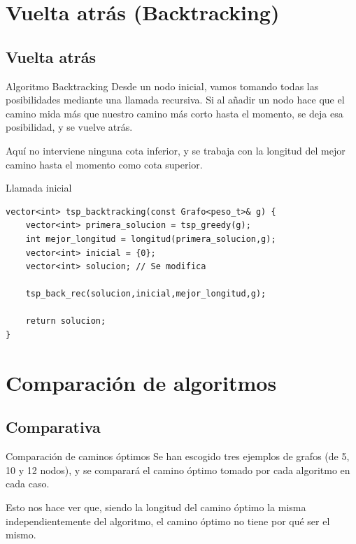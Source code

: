 \section{Vuelta atrás (Backtracking)}

\subsection{Vuelta atrás}

\begin{frame}{Algoritmo Backtracking}
  Desde un nodo inicial, vamos tomando todas las posibilidades mediante una llamada recursiva. Si al añadir un nodo hace que el camino mida más que nuestro camino más corto hasta el momento, se deja esa posibilidad, y se vuelve atrás.
  
  Aquí no interviene ninguna cota inferior, y se trabaja con la longitud del mejor camino hasta el momento como cota superior.
\end{frame}

\begin{frame}[fragile]{Llamada inicial}
\begin{lstlisting}
vector<int> tsp_backtracking(const Grafo<peso_t>& g) {
	vector<int> primera_solucion = tsp_greedy(g);
	int mejor_longitud = longitud(primera_solucion,g);
	vector<int> inicial = {0};
	vector<int> solucion; // Se modifica

	tsp_back_rec(solucion,inicial,mejor_longitud,g);

	return solucion;
}
\end{lstlisting}
\end{frame}

\section{Comparación de algoritmos}

\subsection{Comparativa}

\begin{frame}{Comparación de caminos óptimos}
	Se han escogido tres ejemplos de grafos (de 5, 10 y 12 nodos), y se comparará el camino óptimo tomado por cada algoritmo en cada caso.
	
	Esto nos hace ver que, siendo la longitud del camino óptimo la misma independientemente del algoritmo, el camino óptimo no tiene por qué ser el mismo.
\end{frame}

